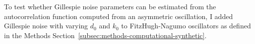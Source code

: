%


To test whether Gillespie noise parameters can be estimated from the autocorrelation function computed from an asymmetric oscillation, I added Gillespie noise with varying $d_{0}$ and $k_{0}$ to FitzHugh-Nagumo oscillators as defined in the Methods Section~\ref{subsec:methods-computational-synthetic}.


